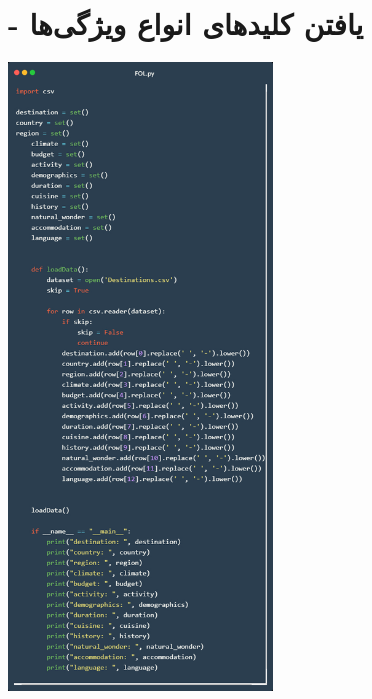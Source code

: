 \documentclass[12pt, dvipsnames, svgnames, x11names,]{article}
\begin{document}
	\section{ - یافتن کلیدهای انواع ویژگی‌ها}
		\begin{center}
			\includegraphics[width=7cm]{images/04}
		\end{center}
	
\end{document}
